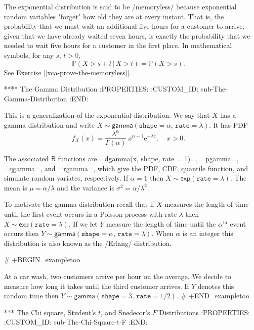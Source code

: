 The exponential distribution is said to be /memoryless/ because
exponential random variables "forget" how old they are at every
instant. That is, the probability that we must wait an additional five
hours for a customer to arrive, given that we have already waited
seven hours, is exactly the probability that we needed to wait five
hours for a customer in the first place. In mathematical symbols, for
any \(s,\, t>0\),
\begin{equation}
\mathbb{P}(X>s+t\,|\, X>t)=\mathbb{P}(X>s).
\end{equation}
See Exercise [[xca-prove-the-memoryless]].

**** The Gamma Distribution
:PROPERTIES:
:CUSTOM_ID: sub-The-Gamma-Distribution
:END:

This is a generalization of the exponential distribution. We say that
\(X\) has a gamma distribution and write
\(X\sim\mathsf{gamma}(\mathtt{shape}=\alpha,\,\mathtt{rate}=\lambda)\). It
has PDF
\begin{equation}
f_{X}(x)=\frac{\lambda^{\alpha}}{\Gamma(\alpha)}\: x^{\alpha-1}\mathrm{e}^{-\lambda x},\quad x>0.
\end{equation}

The associated \(\mathsf{R}\) functions are =dgamma(x, shape, rate =
1)=, =pgamma=, =qgamma=, and =rgamma=, which give the PDF, CDF,
quantile function, and simulate random variates, respectively. If
\(\alpha=1\) then \(X\sim\mathsf{exp}(\mathtt{rate}=\lambda)\). The
mean is \(\mu=\alpha/\lambda\) and the variance is
\(\sigma^{2}=\alpha/\lambda^{2}\).

To motivate the gamma distribution recall that if \(X\) measures the
length of time until the first event occurs in a Poisson process with
rate \(\lambda\) then \(X\sim\mathsf{exp}(\mathtt{rate}=\lambda)\). If
we let \(Y\) measure the length of time until the
\(\alpha^{\mathrm{th}}\) event occurs then
\(Y\sim\mathsf{gamma}(\mathtt{shape}=\alpha,\,\mathtt{rate}=\lambda)\). When
\(\alpha\) is an integer this distribution is also known as the
/Erlang/ distribution.

# +BEGIN_exampletoo

At a car wash, two customers arrive per hour on the average. We decide
to measure how long it takes until the third customer arrives. If
\(Y\) denotes this random time then
\(Y\sim\mathsf{gamma}(\mathtt{shape}=3,\,\mathtt{rate}=1/2)\).
# +END_exampletoo

*** The Chi square, Student's \(t\), and Snedecor's \(F\) Distributions
:PROPERTIES:
:CUSTOM_ID: sub-The-Chi-Square-t-F
:END:

